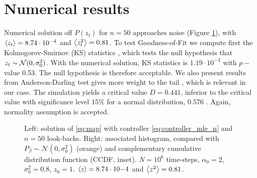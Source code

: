 \documentclass[FinalReport.tex]{subfiles}
\begin{document}
\section{Numerical results}
Numerical solution off $P(z_t)$ for $n=50$ approaches noise (Figure \ref{fig:dist_n_large}), with $\expval{z_t}=8.74\cdot10^{-4}$ and $\expval{z_t^2}=0.81$. To test Goodness-of-Fit we compute first the Kolmogorov-Smirnov (KS) statistics \cite{stat_meth}, which tests the null hypothesis that 
$z_t\sim\mathcal{N}(0,\sigma_0^2)$. With the numerical solution, KS statistics is $1.19\cdot10^{-3}$ with $p-$value 0.53. The null hypothesis is therefore acceptable. We also present results from Anderson-Darling test gives more weight to the tail \cite{test_comp}, which is relevant in our case. The simulation yields a critical value $D=0.441$, inferior to the critical value with significance level $15\%$ for a normal distribution, $0.576$ \cite{anderson-test}. Again, normality assumption is accepted.
\begin{figure}[h]
	\centering
	\caption{Left: solution of \eqref{eq:map} with controller \eqref{eq:controller_mle_n} and $n=50$ look-backs. Right: associated histogram, compared with $P_\beta\sim\mathcal{N}(0,\sigma_0^2)$ (orange) and complementary cumulative distribution function (CCDF, inset). $N=10^6$ time-steps, $\alpha_0=2$, $\sigma_0^2=0.8$, $z_0=1$. $\expval{z}=8.74\cdot10{-4}$ and $\expval{z^2}=0.81$.}
	\label{fig:dist_n_large}
\end{figure}

\def\z{0.916}
\def\varz{5.89}
\def\varzexp{5}
\def\maxz{3.29}
\def\maxzexp{5}
\end{document}
